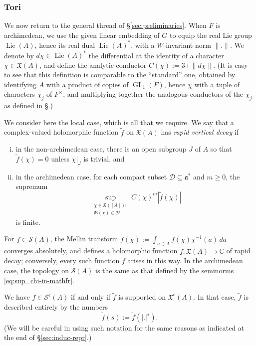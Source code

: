 \documentclass[reqno]{amsart}
\DeclareMathOperator{\GL}{GL}
\DeclareMathOperator{\Lie}{Lie}
\theoremstyle{plain} \newtheorem{theorem} {Theorem}
\theoremstyle{definition} \newtheorem{definition} [theorem] {Definition}
\theoremstyle{itplain} %
\numberwithin{equation}{section}
\numberwithin{theorem}{section}
\renewcommand{\geq}{\geqslant}
\begin{document}
\subsubsection{Tori}\label{sec:tori}
We now return to the general thread of \S\ref{sec:preliminaries}.  When $F$ is archimedean, we use the given linear embedding of $G$ to equip the real Lie group $\Lie(A)$, hence its real dual $\Lie(A)^*$, with a $W$-invariant norm $\|.\|$.  We denote by $d \chi \in \Lie(A)^*$ the differential at the identity of a character $\chi \in \mathfrak{X}(A)$, and define the analytic conductor $C(\chi) := 3 + \|d \chi\|$.  (It is easy to see that this definition is comparable to the ``standard'' one, obtained by identifying $A$ with a product of copies of $\GL_1(F)$, hence $\chi$ with a tuple of characters $\chi_j$ of $F^\times$, and multiplying together the analogous conductors of the $\chi_j$ as defined in \S\cite[\S3.1.8]{michel-2009}.)

We consider here the local case, which is all that we require.  We say that a complex-valued holomorphic function $\tilde{f}$ on $\mathfrak{X}(A)$ has \emph{rapid vertical decay} if
\begin{enumerate}[(i)]
\item in the non-archimedean case, there is an open subgroup $J$ of $A$ so that $\tilde{f}(\chi) = 0$ unless $\chi|_J$ is trivial, and
\item in the archimedean case, for each compact subset $\mathcal{D} \subseteq \mathfrak{a}^*$ and $m \geq 0$, the supremum
  \begin{equation}\label{eq:sup_chi-in-mathfr}
    \sup_{
      \substack{
        \chi \in \mathfrak{X}([A]) :
        \\
          \Re(\chi) \in \mathcal{D}
      }
    }
    C(\chi)^m
    |\tilde{f}(\chi)|
  \end{equation}
  is finite.
\end{enumerate}
For $f \in \mathcal{S}(A)$, the Mellin transform $\tilde{f}(\chi) := \int _{a \in A} f(\chi) \chi^{-1}(a) \, d a$ converges absolutely, and defines a holomorphic function $\tilde{f} : \mathfrak{X}(A) \rightarrow \mathbb{C}$ of rapid decay; conversely, every such function $\tilde{f}$ arises in this way.  In the archimedean case, the topology on $\mathcal{S}(A)$ is the same as that defined by the seminorms \eqref{eq:sup_chi-in-mathfr}.  

We have $f \in \mathcal{S}^e(A)$ if and only if $\tilde{f}$ is supported on $\mathfrak{X}^e(A)$.  In that case, $\tilde{f}$ is described entirely by the numbers
\begin{equation*}
  \tilde{f}(s) := \tilde{f}(|.|^s).
\end{equation*}
(We will be careful in using such notation for the same reasons as indicated at the end of \S\ref{sec:induc-repr}.)
\end{document}
